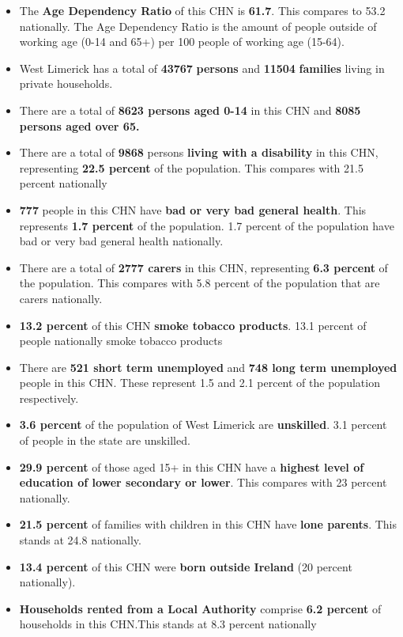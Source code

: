 \documentclass{article}
\begin{document}
\begin{itemize}

\item The \textbf{Age Dependency Ratio} of this CHN is  \textbf{61.7}. This compares to 53.2 nationally. The Age Dependency Ratio is the amount of people outside of working age (0-14 and 65+) per 100 people of working age (15-64). 

\item West Limerick has a total of \textbf{\num{43767}} \textbf{persons} and  \textbf{\num{11504}} \textbf{families} living in private households.

\item There are a total of \textbf{\num{8623} persons aged 0-14} in this CHN and \textbf{\num{8085} persons aged over 65.} 

\item There are a total of \textbf{\num{9868}} persons \textbf{living with a disability} in this CHN, representing \textbf{22.5 percent} of the population. This compares with  21.5 percent nationally

\item \textbf{\num{777}} people in this CHN have \textbf{bad or very bad general health}. This represents \textbf{1.7 percent} of the population. 1.7 percent of the population have bad or very bad general health nationally. 

\item There are a total of \textbf{\num{2777} carers} in this CHN, representing \textbf{6.3 percent} of the population. This compares with 5.8 percent of the population that are carers nationally. 

\item \textbf{13.2 percent} of this CHN \textbf{smoke tobacco products}. 13.1 percent of people nationally smoke tobacco products

\item There are \textbf{\num{521} short term unemployed} and \textbf{\num{748} long term unemployed} people in this CHN. These represent 1.5 and 2.1 percent of the population respectively.

\item  \textbf{3.6 percent} of the population of West Limerick are \textbf{unskilled}. 3.1 percent of people in the state are unskilled.

\item \textbf{29.9 percent} of those aged 15+ in this CHN have a \textbf{highest level of education of lower secondary or lower}. This compares with 23 percent nationally. 

\item \textbf{21.5 percent} of families with children in this CHN have \textbf{lone parents}. This stands at 24.8 nationally.

\item \textbf{13.4 percent} of this CHN were \textbf{born outside Ireland} (20 percent nationally).

\item \textbf{Households rented from a Local Authority} comprise \textbf{6.2 percent} of households in this CHN.This stands at 8.3 percent nationally

\end{itemize}
\end{document}
